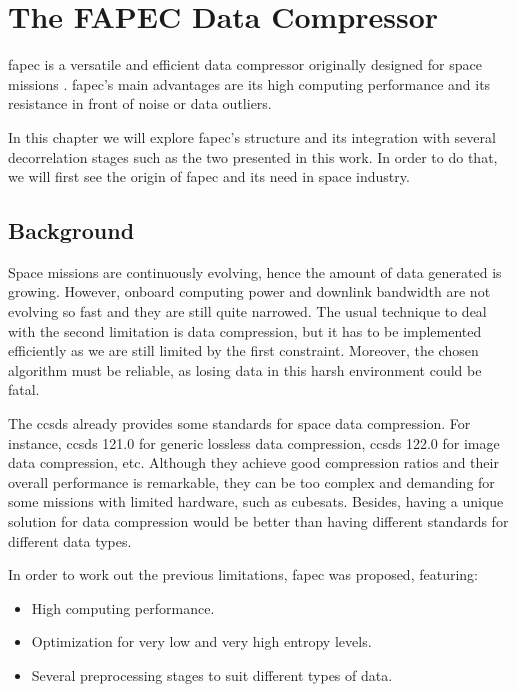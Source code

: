\chapter{The FAPEC Data Compressor}

\acrfull{fapec} is a versatile and efficient data compressor originally designed for space missions \parencite{PaperFAPEC}. \acrshort{fapec}'s main advantages are its high computing performance and its resistance in front of noise or data outliers.

In this chapter we will explore \acrshort{fapec}'s structure and its integration with several decorrelation stages such as the two presented in this work. In order to do that, we will first see the origin of \acrshort{fapec} and its need in space industry.

\section{Background}
Space missions are continuously evolving, hence the amount of data generated is growing. However, onboard computing power and downlink bandwidth are not evolving so fast and they are still quite narrowed. The usual technique to deal with the second limitation is data compression, but it has to be implemented efficiently as we are still limited by the first constraint. Moreover, the chosen algorithm must be reliable, as losing data in this harsh environment could be fatal.

The \acrfull{ccsds} already provides some standards for space data compression. For instance, \acrshort{ccsds} 121.0 \parencite{ccsds121} for generic lossless data compression, \acrshort{ccsds} 122.0 \parencite{ccsds122} for image data compression, etc. Although they achieve good compression ratios and their overall performance is remarkable, they can be too complex and demanding for some missions with limited hardware, such as cubesats. Besides, having a unique solution for data compression would be better than having different standards for different data types.

In order to work out the previous limitations, \acrshort{fapec} was proposed, featuring:
\begin{itemize}
	\item High computing performance.
	\item Optimization for very low and very high entropy levels.
	\item Several preprocessing stages to suit different types of data.
\end{itemize}

